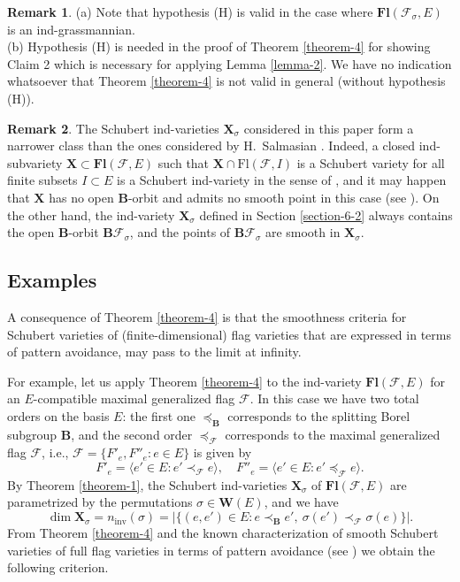 \documentclass[12pt]{amsart}
\theoremstyle{definition}
\newtheorem{remark}{Remark}
\begin{document}
\begin{remark}
{\rm (a)} Note that hypothesis {\rm (H)} is valid in the case where $\mathbf{Fl}(\mathcal{F}_\sigma,E)$ is an ind-grassmannian. \\
{\rm (b)} Hypothesis {\rm (H)} is needed in the proof of Theorem \ref{theorem-4} for showing Claim 2 which is necessary for applying Lemma \ref{lemma-2}. We have no indication whatsoever that Theorem \ref{theorem-4} is not valid in general (without hypothesis {\rm (H)}).
\end{remark}

\begin{remark}
The Schubert ind-varieties $\mathbf{X}_\sigma$ considered in this paper form a narrower class than the ones considered by H.\ Salmasian \cite{Salmasian}. Indeed, a closed ind-subvariety $\mathbf{X}\subset\mathbf{Fl}(\mathcal{F},E)$ such that $\mathbf{X}\cap\mathrm{Fl}(\mathcal{F},I)$ is a Schubert variety for all finite subsets $I\subset E$ is a Schubert ind-variety in the sense of \cite{Salmasian}, and it may happen that $\mathbf{X}$ has no open $\mathbf{B}$-orbit and admits no smooth point in this case (see \cite[Section 2]{Salmasian}). On the other hand, the ind-variety $\mathbf{X}_\sigma$ defined in Section \ref{section-6-2} always contains the open $\mathbf{B}$-orbit $\mathbf{B}\mathcal{F}_\sigma$, and the points of $\mathbf{B}\mathcal{F}_\sigma$ are smooth in $\mathbf{X}_\sigma$.
\end{remark}

\subsection{Examples}

\label{section-4.2}

A consequence of Theorem \ref{theorem-4} is that the smoothness criteria for Schubert varieties of (finite-dimensional) flag varieties that are expressed in terms of pattern avoidance,
may pass to the limit at infinity.

For example, let us apply Theorem \ref{theorem-4} to the ind-variety $\mathbf{Fl}(\mathcal{F},E)$ for an $E$-compatible maximal generalized flag $\mathcal{F}$. In this case we have two total orders on the basis $E$: the first one $\preceq_\mathbf{B}$ corresponds to the splitting Borel subgroup $\mathbf{B}$, and the second order $\preceq_\mathcal{F}$ corresponds to the maximal generalized flag $\mathcal{F}$, i.e., $\mathcal{F}=\{F'_e,F''_e:e\in E\}$ is given by \[F'_e=\langle e'\in E:e'\prec_\mathcal{F}e\rangle,\quad F''_e=\langle e'\in E:e'\preceq_\mathcal{F}e\rangle.\]
By Theorem \ref{theorem-1}, the Schubert ind-varieties $\mathbf{X}_\sigma$ of $\mathbf{Fl}(\mathcal{F},E)$ are parametrized by the permutations $\sigma\in\mathbf{W}(E)$, and we have
\[\dim\mathbf{X}_\sigma=n_\mathrm{inv}(\sigma)=|\{(e,e')\in E:e\prec_\mathbf{B}e',\ \sigma(e')\prec_\mathcal{F}\sigma(e)\}|.\]
From Theorem \ref{theorem-4} and the known characterization of smooth Schubert varieties of full flag varieties in terms of pattern avoidance (see \cite[\S8]{Billey-Lakshmibai}) we obtain the following criterion.
\end{document}
